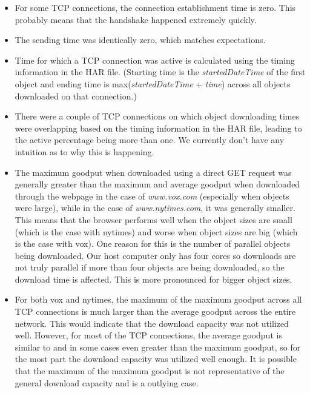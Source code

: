 \documentclass[12pt]{article}
\begin{document}
\begin{itemize}
\item For some TCP connections, the connection establishment time is zero. This probably means that the handshake happened extremely quickly.
\item The sending time was identically zero, which matches expectations.
\item Time for which a TCP connection was active is calculated using the timing information in the HAR file. (Starting time is the \emph{startedDateTime} of the first object and ending time is max(\emph{startedDateTime} + \emph{time}) across all objects downloaded on that connection.)
\item There were a couple of TCP connections on which object downloading times were overlapping based on the timing information in the HAR file, leading to the active percentage being more than one. We currently don't have any intuition as to why this is happening.
\item The maximum goodput when downloaded using a direct GET request was generally greater than the maximum and average goodput when downloaded through the webpage in the case of \emph{www.vox.com} (especially when objects were large), while in the case of \emph{www.nytimes.com}, it was generally smaller. This means that the browser performs well when the object sizes are small (which is the case with nytimes) and worse when object sizes are big (which is the case with vox). One reason for this is the number of parallel objects being downloaded. Our host computer only has four cores so downloads are not truly parallel if more than four objects are being downloaded, so the download time is affected. This is more pronounced for bigger object sizes.
\item For both vox and nytimes, the maximum of the maximum goodput across all TCP connections is much larger than the average goodput across the entire network. This would indicate that the download capacity was not utilized well. However, for most of the TCP connections, the average goodput is similar to and in some cases even greater than the maximum goodput, so for the most part the download capacity was utilized well enough. It is possible that the maximum of the maximum goodput is not representative of the general download capacity and is a outlying case.
\end{itemize}
\hspace*{-1.6cm}
\end{document}
